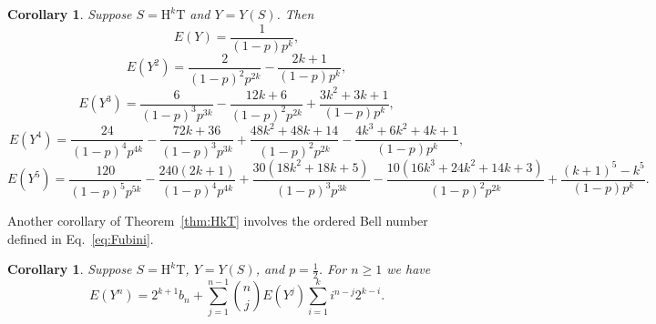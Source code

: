 \documentclass[10pt]{amsart}
\newtheorem{corollary}[theorem]{Corollary}
\theoremstyle{definition}
\theoremstyle{remark}
\newcommand{\HH}{\mathrm{H}} \newcommand{\TT}{\mathrm{T}}
\begin{document}
\begin{corollary}\label{cor:HkT}
Suppose $S=\HH^k\TT$ and $Y=Y(S)$. 
Then
\[ E(Y) = \frac{1}{(1-p)p^k}, \]
\[ E(Y^2) = \frac{2}{(1-p)^2 p^{2k}} - \frac{2k+1}{(1-p) p^k}, \]
\[ E(Y^3) = \frac{6}{(1-p)^3 p^{3k}} - \frac{12k+6}{(1-p)^2 p^{2k}}
+ \frac{3k^2+3k+1}{(1-p) p^k}, \]
\[ E(Y^4) = \frac{24}{(1-p)^4 p^{4k}} - \frac{72k+36}{(1-p)^3 p^{3k}} 
+ \frac{48k^2+48k+14}{(1-p)^2 p^{2k}} - \frac{4k^3+6k^2+4k+1}{(1-p) p^k}, \]
\[ E(Y^5) = \frac{120}{(1-p)^5 p^{5k}} - \frac{240(2k+1)}{(1-p)^4 p^{4k}} 
+ \frac{30(18k^2+18k+5)}{(1-p)^3 p^{3k}} - \frac{10(16k^3+24k^2+14k+3)}{(1-p)^2 p^{2k}}
+ \frac{(k+1)^5-k^5}{(1-p) p^k}. \]
\end{corollary}


Another corollary of Theorem~\ref{thm:HkT} involves the ordered Bell number~\cite[A000670]{OEIS} defined in Eq.~\eqref{eq:Fubini}.

\begin{corollary}
Suppose $S=\HH^k\TT$, $Y=Y(S)$, and $p=\frac12$.
For $n\ge1$ we have 
\[
E(Y^n) = 2^{k+1} b_n + \sum_{j=1}^{n-1} \binom{n}{j} E(Y^j) \sum_{i=1}^k i^{n-j} 2^{k-i}.
\]
\end{corollary}
\end{document}
